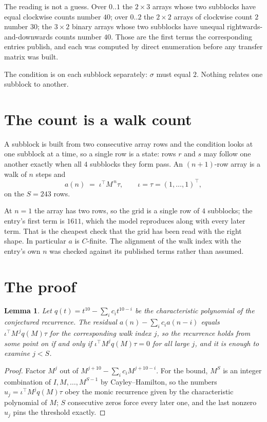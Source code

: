 \documentclass[11pt,a4paper]{article}
\theoremstyle{plain}
\newtheorem{lemma}[theorem]{Lemma}
\theoremstyle{definition}
\begin{document}
The reading is not a guess. Over $0..1$ the $2\times3$ arrays whose two subblocks have equal
clockwise counts number $40$; over $0..2$ the $2\times2$ arrays of clockwise count $2$ number
$30$; the $3\times2$ binary arrays whose two subblocks have unequal rightwards-and-downwards
counts number $40$. Those are the first terms the corresponding entries publish, and each was
computed by direct enumeration before any transfer matrix was built.

The condition is on each subblock separately: $\sigma$ must equal $2$. Nothing
relates one subblock to another.

\section{The count is a walk count}

A subblock is built from two consecutive array rows and the condition looks
at one subblock at a time, so a single row is a state: rows $r$ and $s$ may follow one another
exactly when all $4$ subblocks they form pass. An $(n+1)$-row array is a walk of $n$ steps and
\[
a(n)\;=\;\iota^{\!\top}M^{\,n}\tau,\qquad\iota=\tau=(1,\dots,1)^{\!\top},
\]
on the $S=243$ rows.

At $n=1$ the array has two rows, so the grid is a single row of $4$
subblocks; the entry's first term is $1611$, which the model
reproduces along with every later term. That is the cheapest check that the grid has been read
with the right shape.
In particular $a$ is $C$-finite. The alignment of the walk index with the entry's own $n$ was
checked against its published terms rather than assumed.

\section{The proof}

\begin{lemma}\label{lem:crit}
Let $q(t)=t^{10}-\sum_i c_it^{10-i}$ be the characteristic polynomial of the
conjectured recurrence. The residual $a(n)-\sum_ic_ia(n-i)$ equals
$\iota^{\!\top}M^{\,j}q(M)\tau$ for the corresponding walk index $j$, so the recurrence
holds from some point on if and only if $\iota^{\!\top}M^{j}q(M)\tau=0$ for all large $j$,
and it is enough to examine $j<S$.
\end{lemma}

\begin{proof}
Factor $M^{j}$ out of $M^{j+10}-\sum_ic_iM^{j+10-i}$. For the bound, $M^{S}$
is an integer combination of $I,M,\dots,M^{S-1}$ by Cayley--Hamilton, so the numbers
$u_j=\iota^{\!\top}M^{j}q(M)\tau$ obey the monic recurrence given by the characteristic
polynomial of $M$; $S$ consecutive zeros force every later one, and the last nonzero $u_j$
pins the threshold exactly.
\end{proof}
\end{document}
